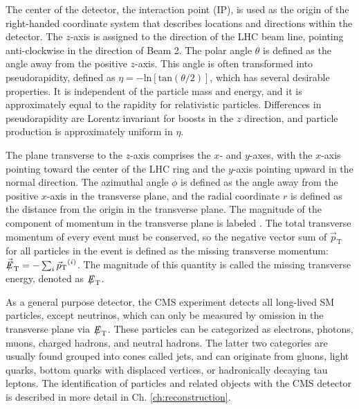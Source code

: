 \documentclass[12pt]{thesis}  %
\def\eslash{\ensuremath{{\hbox{$E$\kern-0.6em\lower-.05ex\hbox{/}\kern0.10em}}}}
\def\vecmet{\mbox{$\vec{\eslash}_\text{T}$}\xspace} %
\def\vecpt{\mbox{$\vec{p}_\text{T}$}\xspace} %
\def\met{\mbox{$\eslash_\text{T}$}\xspace} %
\begin{document}
The center of the detector, the interaction point (IP), is used as the origin of the right-handed coordinate system that describes locations and directions within the detector. The $z$-axis is assigned to the direction of the LHC beam line, pointing anti-clockwise in the direction of Beam 2. The polar angle $\theta$ is defined as the angle away from the positive $z$-axis. This angle is often transformed into pseudorapidity, defined as $\eta = -\text{ln}[\text{tan}(\theta/2)]$, which has several desirable properties. It is independent of the particle mass and energy, and it is approximately equal to the rapidity for relativistic particles. Differences in pseudorapidity are Lorentz invariant for boosts in the $z$ direction, and particle production is approximately uniform in $\eta$.

The plane transverse to the $z$-axis comprises the $x$- and $y$-axes, with the $x$-axis pointing toward the center of the LHC ring and the $y$-axis pointing upward in the normal direction. The azimuthal angle $\phi$ is defined as the angle away from the positive $x$-axis in the transverse plane, and the radial coordinate $r$ is defined as the distance from the origin in the transverse plane. The magnitude of the component of momentum in the transverse plane is labeled \pt. The total transverse momentum of every event must be conserved, so the negative vector sum of \vecpt for all particles in the event is defined as the missing transverse momentum: $\vecmet = - \sum_{i} \vecpt^{(i)}$. The magnitude of this quantity is called the missing transverse energy, denoted as \met.

As a general purpose detector, the CMS experiment detects all long-lived SM particles, except neutrinos, which can only be measured by omission in the transverse plane via \met. These particles can be categorized as electrons, photons, muons, charged hadrons, and neutral hadrons. The latter two categories are usually found grouped into cones called jets, and can originate from gluons, light quarks, bottom quarks with displaced vertices, or hadronically decaying tau leptons. The identification of particles and related objects with the CMS detector is described in more detail in Ch. \ref{ch:reconstruction}.
\end{document}

